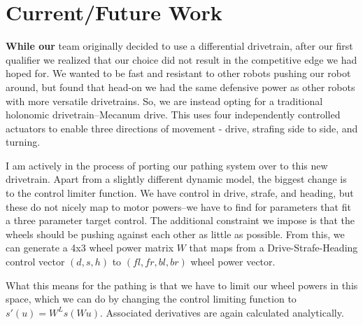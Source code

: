 \documentclass[a4paper,12pt]{article}
\begin{document}
\section{Current/Future Work} 

\textbf{While our} team originally decided to use a differential drivetrain, after our first qualifier we realized that our choice did not result in the competitive edge we had hoped for. We wanted to be fast and resistant to other robots pushing our robot around, but found that head-on we had the same defensive power as other robots with more versatile drivetrains. So, we are instead opting for a traditional holonomic drivetrain--Mecanum drive. This uses four independently controlled actuators to enable three directions of movement - drive, strafing side to side, and turning. 

I am actively in the process of porting our pathing system over to this new drivetrain. Apart from a slightly different dynamic model, the biggest change is to the control limiter function. We have control in drive, strafe, and heading, but these do not nicely map to motor powers--we have to find for parameters that fit a three parameter target control. The additional constraint we impose is that the wheels should be pushing against each other as little as possible. From this, we can generate a 4x3 wheel power matrix $W$ that maps from a Drive-Strafe-Heading control vector $(d, s, h)$ to $(fl, fr, bl, br)$ wheel power vector.

What this means for the pathing is that we have to limit our wheel powers in this space, which we can do by changing the control limiting function to $s'(u) = W^Ls(Wu)$. Associated derivatives are again calculated analytically.
\end{document}
